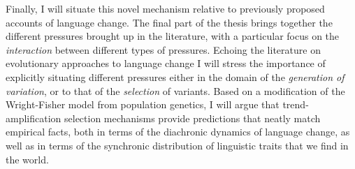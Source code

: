 Finally, I will situate this novel mechanism relative to previously proposed accounts of language change. The final part of the thesis brings together the different pressures brought up in the literature, with a particular focus on the \emph{interaction} between different types of pressures. Echoing the literature on evolutionary approaches to language change I will stress the importance of explicitly situating different pressures either in the domain of the \emph{generation of variation}, or to that of the \emph{selection} of variants. Based on a modification of the Wright-Fisher model from population genetics,
I will argue that trend-amplification selection mechanisms provide predictions that neatly match empirical facts, both in terms of the diachronic dynamics of language change, as well as in terms of the synchronic distribution of linguistic traits that we find in the world.

